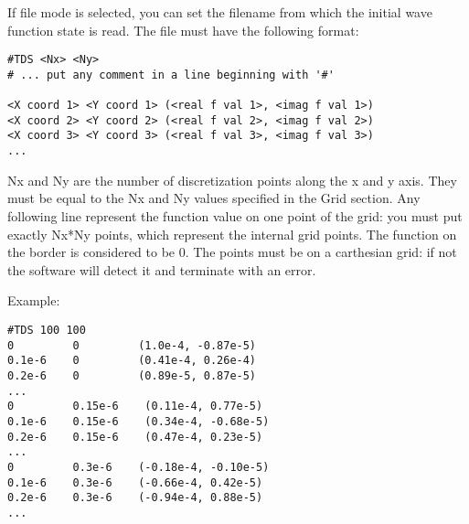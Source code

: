 \documentclass[a4paper,11pt]{article}
\begin{document}
If file mode is selected, you can set the filename from which the initial wave function state is read. The file must have the following format:
\begin{verbatim}
#TDS <Nx> <Ny>
# ... put any comment in a line beginning with '#'

<X coord 1> <Y coord 1> (<real f val 1>, <imag f val 1>)
<X coord 2> <Y coord 2> (<real f val 2>, <imag f val 2>)
<X coord 3> <Y coord 3> (<real f val 3>, <imag f val 3>)
...
\end{verbatim}

Nx and Ny are the number of discretization points along the x and y axis. They must be equal to the Nx and Ny values specified in the Grid section. Any following line represent the function value on one point of the grid: you must put exactly Nx*Ny points, which represent the internal grid points. The function on the border is considered to be 0. The points must be on a carthesian grid: if not the software will detect it and terminate with an error.

Example:
\begin{verbatim}
#TDS 100 100
0         0         (1.0e-4, -0.87e-5)
0.1e-6    0         (0.41e-4, 0.26e-4)
0.2e-6    0         (0.89e-5, 0.87e-5)
...
0         0.15e-6    (0.11e-4, 0.77e-5)
0.1e-6    0.15e-6    (0.34e-4, -0.68e-5)
0.2e-6    0.15e-6    (0.47e-4, 0.23e-5)
...
0         0.3e-6    (-0.18e-4, -0.10e-5)
0.1e-6    0.3e-6    (-0.66e-4, 0.42e-5)
0.2e-6    0.3e-6    (-0.94e-4, 0.88e-5)
...
\end{verbatim}
\end{document}
